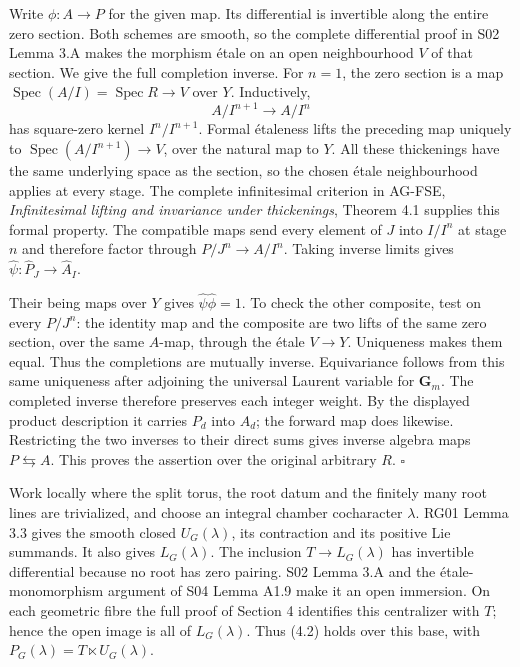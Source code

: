 \documentclass[11pt,a4paper,openany]{report}
\begin{document}
Write \(\phi:A\to P\) for the given map. Its differential is invertible along the entire zero section. Both schemes are smooth, so the complete differential proof in S02 Lemma 3.A makes the morphism étale on an open neighbourhood \(V\) of that section. We give the full completion inverse. For \(n=1\), the zero section is a map \(\operatorname{Spec}(A/I)=\operatorname{Spec}R\to V\) over \(Y\). Inductively, \[
 A/I^{n+1}\longrightarrow A/I^n
\] has square-zero kernel \(I^n/I^{n+1}\). Formal étaleness lifts the preceding map uniquely to \(\operatorname{Spec}(A/I^{n+1})\to V\), over the natural map to \(Y\). All these thickenings have the same underlying space as the section, so the chosen étale neighbourhood applies at every stage. The complete infinitesimal criterion in AG-FSE, \emph{Infinitesimal lifting and invariance under thickenings}, Theorem 4.1 supplies this formal property. The compatible maps send every element of \(J\) into \(I/I^n\) at stage \(n\) and therefore factor through \(P/J^n\to A/I^n\). Taking inverse limits gives \(\widehat\psi:\widehat P_J\to\widehat A_I\).

Their being maps over \(Y\) gives \(\widehat\psi\widehat\phi=1\). To check the other composite, test on every \(P/J^n\): the identity map and the composite are two lifts of the same zero section, over the same \(A\)-map, through the étale \(V\to Y\). Uniqueness makes them equal. Thus the completions are mutually inverse. Equivariance follows from this same uniqueness after adjoining the universal Laurent variable for \(\mathbf G_m\). The completed inverse therefore preserves each integer weight. By the displayed product description it carries \(P_d\) into \(A_d\); the forward map does likewise. Restricting the two inverses to their direct sums gives inverse algebra maps \(P\leftrightarrows A\). This proves the assertion over the original arbitrary \(R\). \(\square\)

Work locally where the split torus, the root datum and the finitely many root lines are trivialized, and choose an integral chamber cocharacter \(\lambda\). RG01 Lemma 3.3 gives the smooth closed \(U_G(\lambda)\), its contraction and its positive Lie summands. It also gives \(L_G(\lambda)\). The inclusion \(T\to L_G(\lambda)\) has invertible differential because no root has zero pairing. S02 Lemma 3.A and the étale-monomorphism argument of S04 Lemma A1.9 make it an open immersion. On each geometric fibre the full proof of Section 4 identifies this centralizer with \(T\); hence the open image is all of \(L_G(\lambda)\). Thus (4.2) holds over this base, with \(P_G(\lambda)=T\ltimes U_G(\lambda)\).
\end{document}
